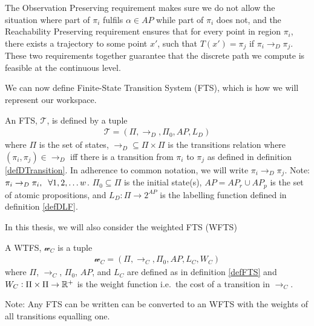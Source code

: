 The Observation Preserving requirement makes sure we do not allow the situation where part of $\pi_i$ fulfils $\alpha \in AP$ while part of $\pi_i$ does not, and the Reachability Preserving requirement ensures that for every point in region $\pi_i$, there exists a trajectory to some point $x'$, such that $T(x') = \pi_j$ if $\pi_i \rightarrow_D \pi_j$. These two requirements together guarantee that the discrete path we compute is feasible at the continuous level.


We can now define Finite-State Transition System (FTS), which is how we will represent our workspace.
\theoremstyle{definition}
\begin{definition}
\label{defFTS}
An FTS, $\mathcal{T}$, is defined by a tuple 
\begin{align*}
\mathcal{T} = (\Pi, \rightarrow_D, \Pi_0, AP,L_D)
\end{align*}
where $\Pi$ is the set of states, $\rightarrow_D \subseteq \Pi \times \Pi$ is the transitions relation where $(\pi_i,\pi_j) \in \rightarrow_D$ iff there is a transition from $\pi_i$ to $\pi_j$ as defined in definition \ref{defDTransition}. In adherence to common notation, we will write $\pi_i \rightarrow_D \pi_j$. Note: $\pi_i \rightarrow_D \pi_i, \hspace{0.2cm} \forall 1,2,\dots w$. $\Pi_0 \subseteq \Pi$ is the initial state(s), $AP=AP_r \cup AP_p$ is the set of atomic propositions, and $L_D: \Pi \rightarrow 2^{AP}$ is the labelling function defined in definition \ref{defDLF}.
\end{definition}


In this thesis, we will also consider the weighted FTS (WFTS)
\begin{definition}
\label{defWFTS}
A WTFS, $\mathcal{w}_C$ is a tuple 
\begin{align}
\mathcal{w}_C = (\Pi, \rightarrow_C, \Pi_0, AP,L_C,W_C)
\end{align}
where $\Pi$, $\rightarrow_C$, $\Pi_0$, $AP$, and $L_C$ are defined as in definition \ref{defFTS} and $W_C: \Pi \times \Pi \rightarrow \mathbb{R}^+$ is the weight function i.e.\ the cost of a transition in $\rightarrow_C$. 
\end{definition}
Note: Any FTS can be written can be converted to an WFTS with the weights of all transitions equalling one.


